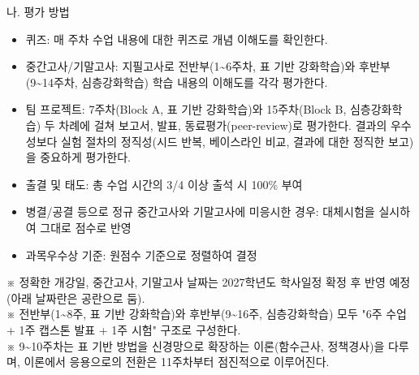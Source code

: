 \documentclass[11pt,a4paper]{article}
\begin{document}
\vspace{3mm}

\noindent 나. 평가 방법

\begin{itemize}[leftmargin=8mm,itemsep=0.8mm,topsep=1mm]

\item 퀴즈: 매 주차 수업 내용에 대한 퀴즈로 개념 이해도를 확인한다.

\item 중간고사/기말고사: 지필고사로 전반부(1\textasciitilde{}6주차, 표 기반 강화학습)와 후반부(9\textasciitilde{}14주차, 심층강화학습) 학습 내용의 이해도를 각각 평가한다.

\item 팀 프로젝트: 7주차(Block A, 표 기반 강화학습)와 15주차(Block B, 심층강화학습) 두 차례에 걸쳐 보고서, 발표, 동료평가(peer-review)로 평가한다. 결과의 우수성보다 실험 절차의 정직성(시드 반복, 베이스라인 비교, 결과에 대한 정직한 보고)을 중요하게 평가한다.

\end{itemize}

\vspace{3mm}


\vspace{2mm}

\begin{itemize}[leftmargin=8mm,itemsep=0.8mm,topsep=1mm]

\item 출결 및 태도: 총 수업 시간의 3/4 이상 출석 시 100\% 부여

\item 병결/공결 등으로 정규 중간고사와 기말고사에 미응시한 경우: 대체시험을 실시하여 그대로 점수로 반영

\item 과목우수상 기준: 원점수 기준으로 정렬하여 결정

\end{itemize}

\vspace{3mm}


\vspace{2mm}

{\small ※ 정확한 개강일, 중간고사, 기말고사 날짜는 2027학년도 학사일정 확정 후 반영 예정 (아래 날짜란은 공란으로 둠). \\※ 전반부(1\textasciitilde{}8주, 표 기반 강화학습)와 후반부(9\textasciitilde{}16주, 심층강화학습) 모두 "6주 수업 + 1주 캡스톤 발표 + 1주 시험" 구조로 구성한다. \\※ 9\textasciitilde{}10주차는 표 기반 방법을 신경망으로 확장하는 이론(함수근사, 정책경사)을 다루며, 이론에서 응용으로의 전환은 11주차부터 점진적으로 이루어진다.}
\end{document}
